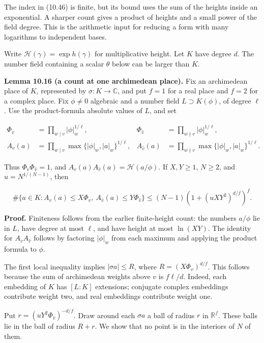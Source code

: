 \documentclass[
  11pt,
  a4paper,
]{article}
\begin{document}
The index in (10.46) is finite, but its bound uses the sum of the
heights inside an exponential. A sharper count gives a product of
heights and a small power of the field degree. This is the arithmetic
input for reducing a form with many logarithms to independent bases.

Write \(\mathcal H(\gamma)=\exp h(\gamma)\) for multiplicative height.
Let \(K\) have degree \(d\). The number field containing a scalar
\(\theta\) below can be larger than \(K\).

\textbf{Lemma 10.16 (a count at one archimedean place).} Fix an
archimedean place of \(K\), represented by \(\sigma:K\to\mathbb C\), and
put \(f=1\) for a real place and \(f=2\) for a complex place. Fix
\(\phi\ne0\) algebraic and a number field \(L\supset K(\phi)\), of
degree \(\ell\). Use the product-formula absolute values of \(L\), and
set

\[
\begin{aligned}
\Phi_v&=\prod_{w\mid v}|\phi|_w^{1/\ell},&
\Phi_{\widehat v}&=\prod_{w\nmid v}|\phi|_w^{1/\ell},\\
A_v(a)&=\prod_{w\mid v}\max\{|\phi|_w,|a|_w\}^{1/\ell},&
A_{\widehat v}(a)&=\prod_{w\nmid v}\max\{|\phi|_w,|a|_w\}^{1/\ell}.
\end{aligned}
\]

Thus \(\Phi_v\Phi_{\widehat v}=1\), and
\(A_v(a)A_{\widehat v}(a)=\mathcal H(a/\phi)\). If \(X,Y\ge1\),
\(N\ge2\), and \(u=N^{1/(N-1)}\), then

\[
\#\{a\in K:A_v(a)\le X\Phi_v,
\ A_{\widehat v}(a)\le Y\Phi_{\widehat v}\}
\le (N-1)\left(1+(uXY^2)^{d/f}\right)^f.
\tag{10.50}
\]

\textbf{Proof.} Finiteness follows from the earlier finite-height count:
the numbers \(a/\phi\) lie in \(L\), have degree at most \(\ell\), and
have height at most \(\ln(XY)\). The identity for \(A_vA_{\widehat v}\)
follows by factoring \(|\phi|_w\) from each maximum and applying the
product formula to \(\phi\).

The first local inequality implies \(|\sigma a|\le R\), where
\(R=(X\Phi_v)^{d/f}\). This follows because the sum of archimedean
weights above \(v\) is \(f\ell/d\). Indeed, each embedding of \(K\) has
\([L:K]\) extensions; conjugate complex embeddings contribute weight
two, and real embeddings contribute weight one.

Put \(r=(uY^2\Phi_{\widehat v})^{-d/f}\). Draw around each \(\sigma a\)
a ball of radius \(r\) in \(\mathbb R^f\). These balls lie in the ball
of radius \(R+r\). We show that no point is in the interiors of \(N\) of
them.
\end{document}

